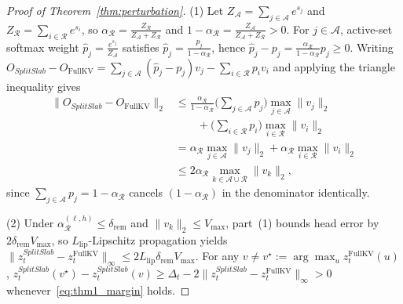 \documentclass[final,5p,times,twocolumn]{elsarticle}
\theoremstyle{definition}
\theoremstyle{remark}
\newcommand{\SplitSlab}{\textup{\textsc{SplitSlab}}}
\def\SplitSlab{SplitSlab}%
\begin{document}
\begin{proof}[Proof of Theorem~\ref{thm:perturbation}]
(1) Let $Z_{\mathcal{A}} = \sum_{j \in \mathcal{A}} e^{s_j}$ and $Z_{\mathcal{R}} = \sum_{i \in \mathcal{R}} e^{s_i}$, so $\alpha_{\mathcal{R}} = \frac{Z_{\mathcal{R}}}{Z_{\mathcal{A}} + Z_{\mathcal{R}}}$ and $1 - \alpha_{\mathcal{R}} = \frac{Z_{\mathcal{A}}}{Z_{\mathcal{A}} + Z_{\mathcal{R}}} > 0$. For $j \in \mathcal{A}$, active-set softmax weight $\hat{p}_j = \frac{e^{s_j}}{Z_{\mathcal{A}}}$ satisfies $\hat{p}_j = \frac{p_j}{1 - \alpha_{\mathcal{R}}}$, hence $\hat{p}_j - p_j = \frac{\alpha_{\mathcal{R}}}{1 - \alpha_{\mathcal{R}}} p_j \ge 0$. Writing $O_{\SplitSlab} - O_{\mathrm{FullKV}} = \sum_{j \in \mathcal{A}} (\hat{p}_j - p_j) v_j - \sum_{i \in \mathcal{R}} p_i v_i$ and applying the triangle inequality gives
\begin{align*}
\|O_{\SplitSlab} - O_{\mathrm{FullKV}}\|_2
&\le \frac{\alpha_{\mathcal{R}}}{1 - \alpha_{\mathcal{R}}} \Big(\sum_{j \in \mathcal{A}} p_j\Big) \max_{j \in \mathcal{A}} \|v_j\|_2 \\
&\qquad + \Big(\sum_{i \in \mathcal{R}} p_i\Big) \max_{i \in \mathcal{R}} \|v_i\|_2 \\
&= \alpha_{\mathcal{R}} \max_{j \in \mathcal{A}} \|v_j\|_2 + \alpha_{\mathcal{R}} \max_{i \in \mathcal{R}} \|v_i\|_2 \\
&\le 2\alpha_{\mathcal{R}} \max_{k \in \mathcal{A}\cup\mathcal{R}} \|v_k\|_2,
\end{align*}
since $\sum_{j \in \mathcal{A}} p_j = 1 - \alpha_{\mathcal{R}}$ cancels $(1 - \alpha_{\mathcal{R}})$ in the denominator identically.

(2) Under $\alpha_{\mathcal{R}}^{(\ell,h)} \le \delta_{\mathrm{rem}}$ and $\|v_k\|_2 \le V_{\max}$, part~(1) bounds head error by $2\delta_{\mathrm{rem}} V_{\max}$, so $L_{\mathrm{lip}}$-Lipschitz propagation yields $\|z_t^{\SplitSlab} - z_t^{\mathrm{FullKV}}\|_\infty \le 2 L_{\mathrm{lip}} \delta_{\mathrm{rem}} V_{\max}$. For any $v \neq v^\star := \arg\max_u z_t^{\mathrm{FullKV}}(u)$, $z_t^{\SplitSlab}(v^\star) - z_t^{\SplitSlab}(v) \ge \Delta_t - 2\|z_t^{\SplitSlab} - z_t^{\mathrm{FullKV}}\|_\infty > 0$ whenever~\eqref{eq:thm1_margin} holds.
\end{proof}
\end{document}
